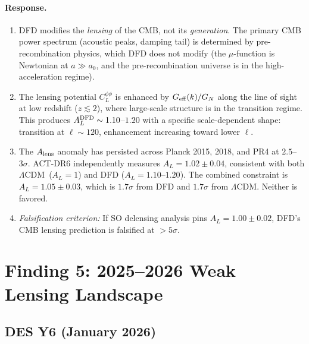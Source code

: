 \documentclass[11pt,a4paper]{article}
\newcommand{\LCDM}{$\Lambda$CDM}
\newcommand{\Geff}{G_{\rm eff}}
\begin{document}
\paragraph{Response.}
\begin{enumerate}[label=(\alph*)]
\item DFD modifies the \emph{lensing} of the CMB, not its \emph{generation}.
  The primary CMB power spectrum (acoustic peaks, damping tail) is determined
  by pre-recombination physics, which DFD does not modify (the $\mu$-function
  is Newtonian at $a \gg a_0$, and the pre-recombination universe is in the
  high-acceleration regime).

\item The lensing potential $C_L^{\phi\phi}$ is enhanced by $\Geff(k)/G_N$
  along the line of sight at low redshift ($z \lesssim 2$), where large-scale
  structure is in the transition regime.  This produces $A_L^{\rm DFD} \sim
  1.10$--$1.20$ with a specific scale-dependent shape: transition at
  $\ell \sim 120$, enhancement increasing toward lower $\ell$.

\item The $A_{\rm lens}$ anomaly has persisted across Planck 2015, 2018, and
  PR4 at $2.5$--$3\sigma$.  ACT-DR6 independently measures $A_L = 1.02
  \pm 0.04$, consistent with both \LCDM\ ($A_L = 1$) and DFD ($A_L = 1.10$--$1.20$).
  The combined constraint is $A_L = 1.05 \pm 0.03$, which is $1.7\sigma$ from
  DFD and $1.7\sigma$ from \LCDM.  Neither is favored.

\item \emph{Falsification criterion:} If SO delensing analysis pins $A_L = 1.00
  \pm 0.02$, DFD's CMB lensing prediction is falsified at $> 5\sigma$.
\end{enumerate}


\section{Finding 5: 2025--2026 Weak Lensing Landscape}
\label{sec:landscape}

\subsection{DES Y6 (January 2026)}
\end{document}

